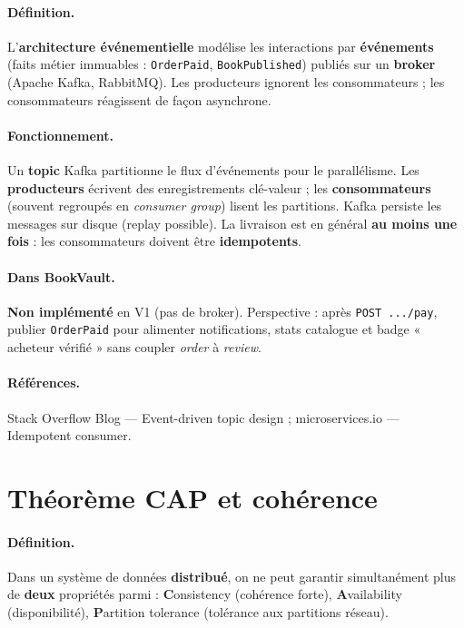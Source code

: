 \documentclass[12pt,a4paper]{report}
\begin{document}
\paragraph{Définition.} L'\textbf{architecture événementielle} modélise les interactions par \textbf{événements} (faits métier immuables : \texttt{OrderPaid}, \texttt{BookPublished}) publiés sur un \textbf{broker} (Apache Kafka, RabbitMQ). Les producteurs ignorent les consommateurs ; les consommateurs réagissent de façon asynchrone.\par

\paragraph{Fonctionnement.} Un \textbf{topic} Kafka partitionne le flux d'événements pour le parallélisme. Les \textbf{producteurs} écrivent des enregistrements clé-valeur ; les \textbf{consommateurs} (souvent regroupés en \textit{consumer group}) lisent les partitions. Kafka persiste les messages sur disque (replay possible). La livraison est en général \textbf{au moins une fois} : les consommateurs doivent être \textbf{idempotents}.\par

\paragraph{Dans BookVault.} \textbf{Non implémenté} en V1 (pas de broker). Perspective : après \texttt{POST .../pay}, publier \texttt{OrderPaid} pour alimenter notifications, stats catalogue et badge « acheteur vérifié » sans coupler \textit{order} à \textit{review}.\par

\paragraph{Références.} Stack Overflow Blog — Event-driven topic design ; microservices.io — Idempotent consumer.\par


\section{Théorème CAP et cohérence}

\paragraph{Définition.} Dans un système de données \textbf{distribué}, on ne peut garantir simultanément plus de \textbf{deux} propriétés parmi : \textbf{C}onsistency (cohérence forte), \textbf{A}vailability (disponibilité), \textbf{P}artition tolerance (tolérance aux partitions réseau).\par
\end{document}
